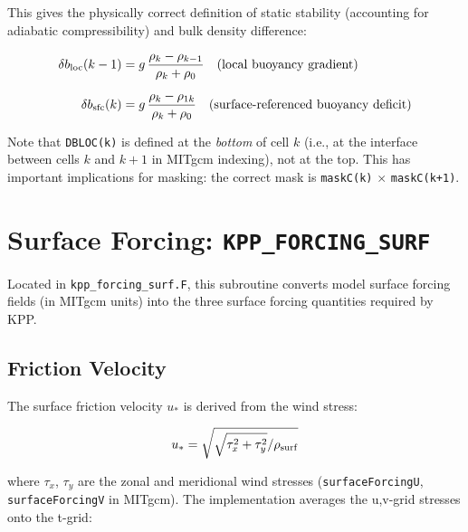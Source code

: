 \documentclass[12pt,letterpaper]{article}
\newcommand{\ustar}{u_*}
\begin{document}
This gives the physically correct definition of static stability  
(accounting for adiabatic compressibility) and bulk density difference:  
  
\begin{align}  
\delta b_{\rm loc}(k-1) &= g\,\frac{\rho_k - \rho_{k-1}}{\rho_k + \rho_0}  
\quad \text{(local buoyancy gradient)} \\[6pt]  
\delta b_{\rm sfc}(k) &= g\,\frac{\rho_k - \rho_{1k}}{\rho_k + \rho_0}  
\quad \text{(surface-referenced buoyancy deficit)}  
\end{align}  
  
Note that \texttt{DBLOC(k)} is defined at the \textit{bottom} of cell $k$  
(i.e., at the interface between cells $k$ and $k+1$ in MITgcm indexing),  
not at the top. This has important implications for masking: the correct  
mask is \texttt{maskC(k)} $\times$ \texttt{maskC(k+1)}.  
  
\section{Surface Forcing: \texttt{KPP\_FORCING\_SURF}}  
  
Located in \texttt{kpp\_forcing\_surf.F}, this subroutine converts  
model surface forcing fields (in MITgcm units) into the three  
surface forcing quantities required by KPP.  
  
\subsection{Friction Velocity}  
  
The surface friction velocity $\ustar$ is derived from the wind stress:  
  
\begin{equation}  
\ustar = \sqrt{\sqrt{\tau_x^2 + \tau_y^2} / \rho_{\rm surf}}  
\end{equation}  
  
where $\tau_x$, $\tau_y$ are the zonal and meridional wind stresses  
(\texttt{surfaceForcingU}, \texttt{surfaceForcingV} in MITgcm).  
The implementation averages the u,v-grid stresses onto the t-grid:  
  
\end{document}
